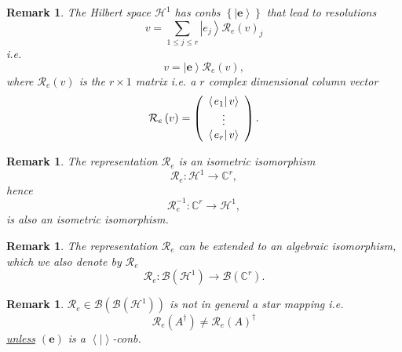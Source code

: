 \documentclass[aps,preprint]{revtex4}%
\newtheorem{remark}[theorem]{Remark}
\begin{document}
\begin{remark}
The Hilbert space $\mathcal{H}^{1}$ has conbs $\left\{  \left\vert
\mathbf{e}\right\rangle \right\}  $ that lead to resolutions
\begin{equation}
v=\sum_{1\leq j\leq r}\left\vert e_{j}\right\rangle \mathcal{R}_{e}\left(
v\right)  _{j}%
\end{equation}
i.e.
\begin{equation}
v=\left\vert \mathbf{e}\right\rangle \mathcal{R}_{e}\left(  v\right)  ,
\end{equation}
where $\mathcal{R}_{e}\left(  v\right)  $ is the $r\times1$ matrix i.e. a $r$
complex dimensional column vector
\begin{equation}
\mathcal{R}_{e}\left(  v\right)  =\left(
\begin{array}
[c]{c}%
\left\langle \left.  e_{1}\right\vert v\right\rangle \\
\vdots\\
\left\langle \left.  e_{r}\right\vert v\right\rangle
\end{array}
\right)  .
\end{equation}

\end{remark}

\begin{remark}
The representation $\mathcal{R}_{e}$ is an isometric isomorphism
\begin{equation}
\mathcal{R}_{e}:\mathcal{H}^{1}\rightarrow\mathbb{C}^{r},
\end{equation}
hence
\begin{equation}
\mathcal{R}_{e}^{-1}:\mathbb{C}^{r}\rightarrow\mathcal{H}^{1},
\end{equation}
is also an isometric isomorphism.
\end{remark}

\begin{remark}
The representation $\mathcal{R}_{e}$ can be extended to an \emph{algebraic
isomorphism, which we also denote by }$\mathcal{R}_{e}$\emph{ }
\begin{equation}
\mathcal{R}_{e}:\mathcal{B}\left(  \mathcal{H}^{1}\right)  \rightarrow
\mathcal{B}\left(  \mathbb{C}^{r}\right)  .
\end{equation}

\end{remark}

\begin{remark}
$\mathcal{R}_{e}\in\mathcal{B}\left(  \mathcal{B}\left(  \mathcal{H}%
^{1}\right)  \right)  $ is not in general a star mapping i.e.
\begin{equation}
\mathcal{R}_{e}\left(  A^{\dagger}\right)  \neq\mathcal{R}_{e}\left(
A\right)  ^{\dagger}%
\end{equation}
\underline{\emph{unless}} $\left(  \mathbf{e}\right)  $ is a $\left\langle
\left.  {}\right\vert \right\rangle $-conb.
\end{remark}
\end{document}
